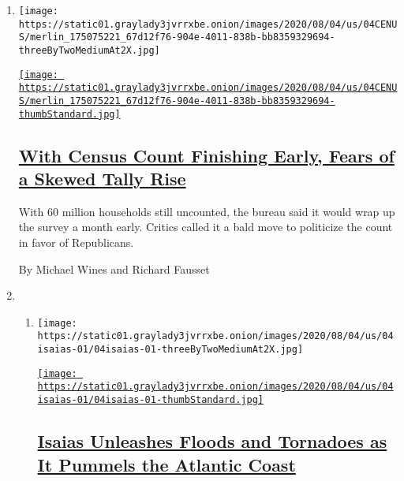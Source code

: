 \begin{enumerate}
\def\labelenumi{\arabic{enumi}.}
\item
  \texttt{[image: https://static01.graylady3jvrrxbe.onion/images/2020/08/04/us/04CENUS/merlin\_175075221\_67d12f76-904e-4011-838b-bb8359329694-threeByTwoMediumAt2X.jpg]}

  \href{/2020/08/04/us/2020-census-ending-early.html}{\texttt{[image: https://static01.graylady3jvrrxbe.onion/images/2020/08/04/us/04CENUS/merlin\_175075221\_67d12f76-904e-4011-838b-bb8359329694-thumbStandard.jpg]}}

  \hypertarget{with-census-count-finishing-early-fears-of-a-skewed-tally-rise}{%
  \subsection{\texorpdfstring{\href{/2020/08/04/us/2020-census-ending-early.html}{With
  Census Count Finishing Early, Fears of a Skewed Tally
  Rise}}{With Census Count Finishing Early, Fears of a Skewed Tally Rise}}\label{with-census-count-finishing-early-fears-of-a-skewed-tally-rise}}

  With 60 million households still uncounted, the bureau said it would
  wrap up the survey a month early. Critics called it a bald move to
  politicize the count in favor of Republicans.

  By Michael Wines and Richard Fausset
\item
  \begin{enumerate}
  \def\labelenumii{\arabic{enumii}.}
  \item
    \texttt{[image: https://static01.graylady3jvrrxbe.onion/images/2020/08/04/us/04isaias-01/04isaias-01-threeByTwoMediumAt2X.jpg]}

    \href{/2020/08/04/us/hurricane-isaias-updates.html}{\texttt{[image: https://static01.graylady3jvrrxbe.onion/images/2020/08/04/us/04isaias-01/04isaias-01-thumbStandard.jpg]}}

    \hypertarget{isaias-unleashes-floods-and-tornadoes-as-it-pummels-the-atlantic-coast}{%
    \subsection{\texorpdfstring{\href{/2020/08/04/us/hurricane-isaias-updates.html}{Isaias
    Unleashes Floods and Tornadoes as It Pummels the Atlantic
    Coast}}{Isaias Unleashes Floods and Tornadoes as It Pummels the Atlantic Coast}}\label{isaias-unleashes-floods-and-tornadoes-as-it-pummels-the-atlantic-coast}}


\end{enumerate}
\end{enumerate}
